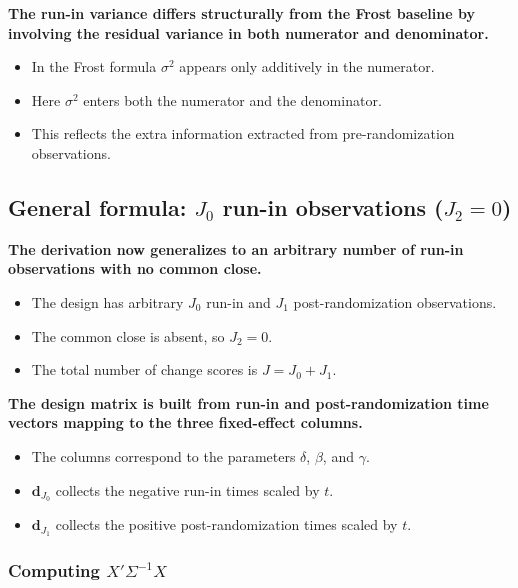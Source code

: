 \documentclass[
  11pt,
]{article}
\begin{document}
\textbf{The run-in variance differs structurally from the Frost baseline by involving the residual variance in both numerator and denominator.}

\begin{itemize}\setlength{\itemsep}{2pt}\setlength{\parskip}{0pt}
\item In the Frost formula $\sigma^2$ appears only additively in the numerator.
\item Here $\sigma^2$ enters both the numerator and the denominator.
\item This reflects the extra information extracted from pre-randomization observations.
\end{itemize}

\subsection{\texorpdfstring{General formula: \(J_0\) run-in observations (\(J_2=0\))}{General formula: J\_0 run-in observations (J\_2=0)}}\label{general-formula-j_0-run-in-observations-j_20}

\textbf{The derivation now generalizes to an arbitrary number of run-in observations with no common close.}

\begin{itemize}\setlength{\itemsep}{2pt}\setlength{\parskip}{0pt}
\item The design has arbitrary $J_0$ run-in and $J_1$ post-randomization observations.
\item The common close is absent, so $J_2 = 0$.
\item The total number of change scores is $J = J_0 + J_1$.
\end{itemize}

\textbf{The design matrix is built from run-in and post-randomization time vectors mapping to the three fixed-effect columns.}

\begin{itemize}\setlength{\itemsep}{2pt}\setlength{\parskip}{0pt}
\item The columns correspond to the parameters $\delta$, $\beta$, and $\gamma$.
\item $\mathbf{d}_{J_0}$ collects the negative run-in times scaled by $t$.
\item $\mathbf{d}_{J_1}$ collects the positive post-randomization times scaled by $t$.
\end{itemize}

\subsubsection{\texorpdfstring{Computing \(X'\Sigma^{-1}X\)}{Computing X\textquotesingle\textbackslash Sigma\^{}\{-1\}X}}\label{computing-xsigma-1x}
\end{document}
